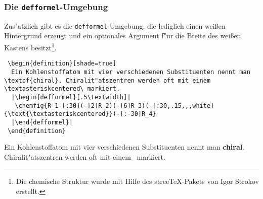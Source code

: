 \documentclass[a4paper,10pt,headsepline]{scrartcl}
\begin{document}
\subsubsection{Die \texttt{defformel}-Umgebung}
Zus"atzlich gibt es die \texttt{defformel}-Umgebung, die lediglich einen wei\ss{}en Hintergrund erzeugt und ein optionales Argument f"ur die Breite des wei\ss en Kastens besitzt\footnote{Die chemische Struktur wurde mit Hilfe des stree\TeX-Pakets von Igor Strokov erstellt.}.
\begin{lstlisting}
 \begin{definition}[shade=true]
  Ein Kohlenstoffatom mit vier verschiedenen Substituenten nennt man \textbf{chiral}. Chiralit"atszentren werden oft mit einem \textasteriskcentered\ markiert.
  |\begin{defformel}[.5\textwidth]|
   \chemfig{R_1-[:30](-[2]R_2)(-[6]R_3)(-[:30,.15,,,white]{\text{\textasteriskcentered}})-[:-30]R_4}
  |\end{defformel}|
 \end{definition}
\end{lstlisting}

\begin{definition}[shade=true]
  Ein Kohlenstoffatom mit vier verschiedenen Substituenten nennt man \textbf{chiral}. Chiralit"atszentren werden oft mit einem \stec\ markiert.
  \begin{defformel}[.5\textwidth]
  \end{defformel}
 \end{definition}
\end{document}
